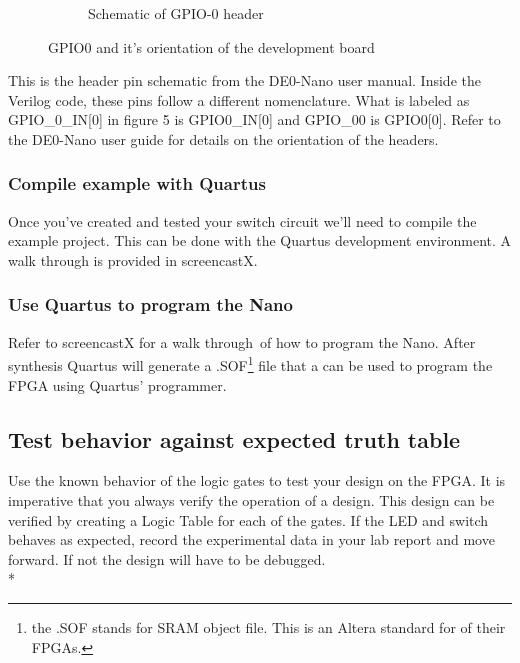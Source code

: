 \begin{figure}
\begin{subfigure}[b]{.45\textwidth}
            \caption{Schematic of GPIO-0 header\cite{DE0Manual}}
          \end{subfigure}
          \caption{GPIO0 and it's orientation of the development board}
          \label{pinmap}
        \end{figure}
        This is the header pin schematic from the DE0-Nano user manual. Inside the Verilog code, these pins follow a different nomenclature. What is labeled as GPIO\_0\_IN[0] in figure 5 is GPIO0\_IN[0] and GPIO\_00 is GPIO0[0]. Refer to the DE0-Nano user guide for details on the orientation of the headers.        
      
      \subsubsection{Compile example with Quartus}
        Once you've created and tested your switch circuit we'll need to compile the example project. This can be done with the Quartus development environment. A walk through is provided in screencastX. 

      \subsubsection{Use Quartus to program the Nano} 
        Refer to screencastX for a walk through of how to program the Nano. After synthesis Quartus will generate a .SOF\footnote{the .SOF stands for SRAM object file. This is an Altera standard for of their FPGAs.} file that a can be used to program the FPGA using Quartus' programmer.

      \subsection{Test behavior against expected truth table} 
        Use the known behavior of the logic gates to test your design on the FPGA. It is imperative that you always verify the operation of a design. This design can be verified by creating a Logic Table for each of the gates. If the LED and switch behaves as expected, record the experimental data in your lab report and move forward. If not the design will have to be debugged.\\*

